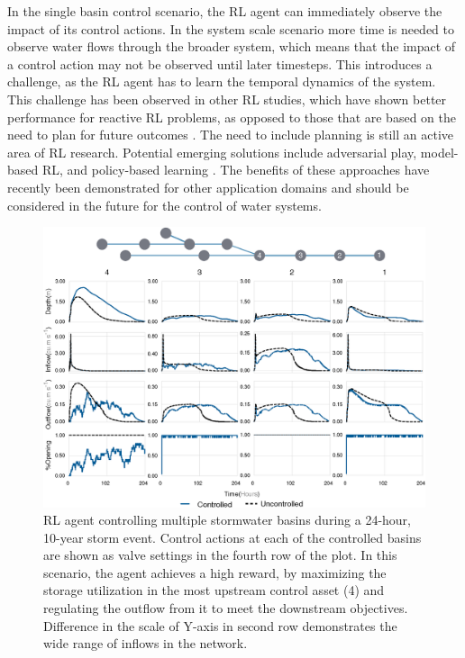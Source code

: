 In the single basin control scenario, the RL agent can immediately observe the impact of its control actions.
In the system scale scenario more time is needed to observe water flows through the broader system, which means that the impact of a control action may not be observed until later timesteps.
This introduces a challenge, as the RL agent has to learn the temporal dynamics of the system.
This challenge has been observed in other RL studies, which have shown better performance for reactive RL problems, as opposed to those that are based on the need to plan for future outcomes \cite{aytar2018playing}.
The need to include planning is still an active area of RL research.
Potential emerging solutions include adversarial play\cite{silver2017masteringgo,Silver2017MasteringAlgorithm}, model-based RL\cite{clavera2018model}, and policy-based learning \cite{Schulman2017ProximalAlgorithms}.
The benefits of these approaches have recently been demonstrated for other application domains and should be considered in the future for the control of water systems.

\begin{figure}
    \centering
    \includegraphics[width=\textwidth]{gfx/Chapter-3/system_scale_2.eps}
    \caption{RL agent controlling multiple stormwater basins during a 24-hour, 10-year storm event. Control actions at each of the controlled basins are shown as valve settings in the fourth row of the plot. In this scenario, the agent achieves a high reward, by maximizing the storage utilization in the most upstream control asset (4) and regulating the outflow from it to meet the downstream objectives. Difference in the scale of Y-axis in second row demonstrates the wide range of inflows in the network.}\label{fig:ch3-fig6}
\end{figure}

